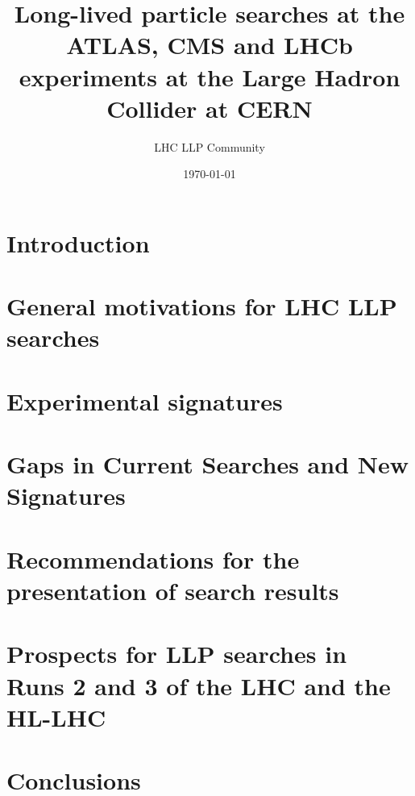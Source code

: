 \documentclass[a4paper,debug,notitlepage,nobib]{tufte-book}
\title{Long-lived particle searches at the ATLAS, CMS and LHCb \\ \smallskip \noindent experiments at the Large Hadron Collider at CERN}
\author{LHC LLP Community}
\date{\today}
\begin{document}
\setcounter{secnumdepth}{3} %



\setcounter{tocdepth}{3}
\tableofcontents
 
\pagebreak

\chapter{Introduction}
\label{sec:Introduction}


\chapter{General motivations for LHC LLP searches}
\label{sec:motivation}


\chapter{Experimental signatures}
\label{sec:signatures}


\chapter{Gaps in Current Searches and New Signatures}
\label{sec:gaps}


\chapter{Recommendations for the presentation of search results}
\label{sec:recommendations}


\chapter{Prospects for LLP searches in Runs 2 and 3 of the LHC and the HL-LHC}
\label{sec:future} 


\chapter{Conclusions}
\label{sec:conclusions}

 


\appendix

%
\end{document}
